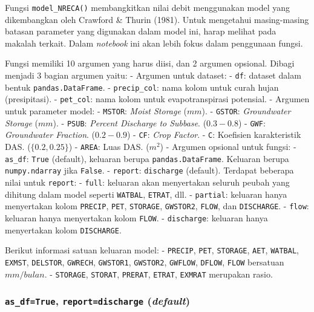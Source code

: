 \documentclass[11pt]{article}
\begin{document}
Fungsi \texttt{model\_NRECA()} membangkitkan nilai debit menggunakan
model yang dikembangkan oleh Crawford \& Thurin (1981). Untuk mengetahui
masing-masing batasan parameter yang digunakan dalam model ini, harap
melihat pada makalah terkait. Dalam \emph{notebook} ini akan lebih fokus
dalam penggunaan fungsi.

Fungsi memiliki 10 argumen yang harus diisi, dan 2 argumen opsional.
Dibagi menjadi 3 bagian argumen yaitu: - Argumen untuk dataset: -
\texttt{df}: dataset dalam bentuk \texttt{pandas.DataFrame}. -
\texttt{precip\_col}: nama kolom untuk curah hujan (presipitasi). -
\texttt{pet\_col}: nama kolom untuk evapotranspirasi potensial. -
Argumen untuk parameter model: - \texttt{MSTOR}: \emph{Moist Storage}
(\(mm\)). - \texttt{GSTOR}: \emph{Groundwater Storage} (\(mm\)). -
\texttt{PSUB}: \emph{Percent Discharge to Subbase}. (\(0.3-0.8\)) -
\texttt{GWF}: \emph{Groundwater Fraction}. (\(0.2-0.9\)) - \texttt{CF}:
\emph{Crop Factor}. - \texttt{C}: Koefisien karakteristik DAS.
(\(\{0.2,0.25\}\)) - \texttt{AREA}: Luas DAS. (\(m^2\)) - Argumen
opsional untuk fungsi: - \texttt{as\_df}: \texttt{True} (default),
keluaran berupa \texttt{pandas.DataFrame}. Keluaran berupa
\texttt{numpy.ndarray} jika \texttt{False}. - \texttt{report}:
\texttt{discharge} (default). Terdapat beberapa nilai untuk
\texttt{report}: - \texttt{full}: keluaran akan menyertakan seluruh
peubah yang dihitung dalam model seperti \texttt{WATBAL},
\texttt{ETRAT}, dll. - \texttt{partial}: keluaran hanya menyertakan
kolom \texttt{PRECIP}, \texttt{PET}, \texttt{STORAGE}, \texttt{GWSTOR2},
\texttt{FLOW}, dan \texttt{DISCHARGE}. - \texttt{flow}: keluaran hanya
menyertakan kolom \texttt{FLOW}. - \texttt{discharge}: keluaran hanya
menyertakan kolom \texttt{DISCHARGE}.

Berikut informasi satuan keluaran model: - \texttt{PRECIP},
\texttt{PET}, \texttt{STORAGE}, \texttt{AET}, \texttt{WATBAL},
\texttt{EXMST}, \texttt{DELSTOR}, \texttt{GWRECH}, \texttt{GWSTOR1},
\texttt{GWSTOR2}, \texttt{GWFLOW}, \texttt{DFLOW}, \texttt{FLOW}
bersatuan \(mm/bulan\). - \texttt{STORAGE}, \texttt{STORAT},
\texttt{PRERAT}, \texttt{ETRAT}, \texttt{EXMRAT} merupakan rasio.

    \hypertarget{as_dftrue-reportdischarge-default}{%
\subsubsection{\texorpdfstring{\texttt{as\_df=True},
\texttt{report=\textquotesingle{}discharge\textquotesingle{}}
(\emph{default})}{as\_df=True, report='discharge' (default)}}\label{as_dftrue-reportdischarge-default}}
\end{document}
